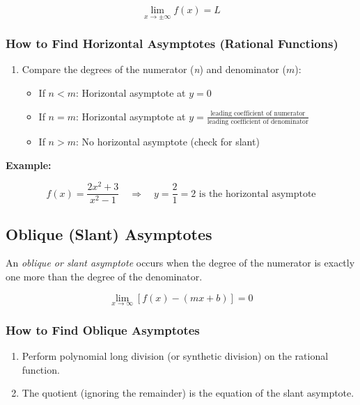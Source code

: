 \[
    \lim_{x \to \pm\infty} f(x) = L
\]

\subsubsection{How to Find Horizontal Asymptotes (Rational Functions)}

\begin{enumerate}

    \item Compare the degrees of the numerator (\emph{n}) and denominator (\(m\)):

    \begin{itemize}

        \item If \(n < m\): Horizontal asymptote at \(y = 0\)

        \item If \(n = m\): Horizontal asymptote at \(y = \frac{\text{leading coefficient of numerator}}
        {\text{leading coefficient of denominator}}\)

        \item If \(n > m\): No horizontal asymptote (check for slant)

    \end{itemize}

\end{enumerate}

\textbf{Example:}
\vspace{\baselineskip}

\[
    f(x) = \frac{2x^2 + 3}{x^2 - 1} \quad \Rightarrow \quad y = \frac{2}{1} = 2 
    \text{ is the horizontal asymptote}
\]

\subsection{Oblique (Slant) Asymptotes}

An \emph{oblique or slant asymptote} occurs when the degree of the numerator is exactly one more than 
the degree of the denominator.

\[
    \lim_{x \to \infty} [f(x) - (mx + b)] = 0
\]

\subsubsection{How to Find Oblique Asymptotes}

\begin{enumerate}
    
    \item Perform polynomial long division (or synthetic division) on the rational function.
    
    \item The quotient (ignoring the remainder) is the equation of the slant asymptote.

\end{enumerate}

